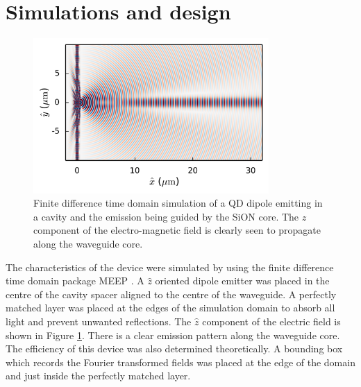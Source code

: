 \section{Simulations and design}

\begin{figure}[h!] \begin{center}
\includegraphics[width=0.8\textwidth]{images/sim.png} \caption{
Finite difference time domain simulation of a QD dipole emitting in a cavity and
the emission being guided by the SiON core. The $\hat{z}$ component of the
electro-magnetic field is  clearly seen to propagate along the waveguide core.
} \label{fig:sim} \end{center} \end{figure}

The characteristics of the device were simulated by using the finite difference
time domain package MEEP \cite{oskooi2010meep, mandelshtam1997harmonic}. A
$\hat{z}$ oriented dipole emitter was placed in the centre of the cavity spacer
aligned to the centre of the waveguide. A perfectly matched layer was placed at
the edges of the simulation domain to absorb all light and prevent unwanted
reflections. The $\hat{z}$ component of the electric field is shown in Figure
\ref{fig:sim}. There is a clear emission pattern along the waveguide core. The
efficiency of this device was also determined theoretically. A bounding box
which records the Fourier transformed fields was placed at the edge of the
domain and just inside the perfectly matched layer.

